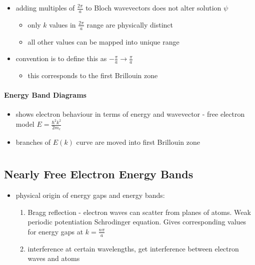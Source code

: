 \documentclass[a4paper,11pt,normalem]{article}
\begin{document}
\begin{itemize}
    \item adding multiples of \(\frac{2\pi}{a}\) to Bloch wavevectors does not alter solution \(\psi\)
        \begin{itemize}
            \item only \(k\) values in \(\frac{2\pi}{a}\) range are physically distinct
            \item all other values can be mapped into unique range
        \end{itemize}
    \item convention is to define this as \(-\frac{\pi}{a} \to \frac{\pi}{a}\)
        \begin{itemize}
            \item this corresponds to the first Brillouin zone
        \end{itemize}
\end{itemize}

\paragraph{Energy Band Diagrams}

\begin{itemize}
    \item shows electron behaviour in terms of energy and wavevector - free electron model \(E = \frac{\hbar^2k^2}{2m_e}\)
    \item branches of \(E(k)\) curve are moved into first Brillouin zone
\end{itemize}

\section{}

\subsection{Nearly Free Electron Energy Bands}

\begin{itemize}
    \item physical origin of energy gaps and energy bands:
        \begin{enumerate}
            \item Bragg reflection - electron waves can scatter from planes of atoms. Weak periodic potentiation Schrodinger equation. Gives corresponding values for energy gaps at \(k = \frac{n\pi}{a}\)
            \item interference at certain wavelengths, get interference between electron waves and atoms
        \end{enumerate}
\end{itemize}
\end{document}
